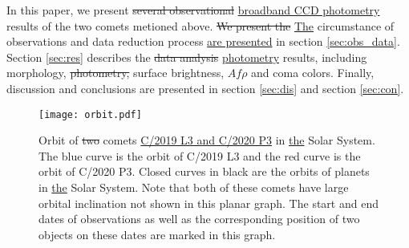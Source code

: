 In this paper, we present \st{several observational} \ul{broadband CCD photometry} results of the two comets metioned above. \st{We present the} \ul{The} circumstance of observations and data reduction process \ul{are presented} in section \ref{sec:obs_data}. Section \ref{sec:res} describes the \st{data analysis} \ul{photometry} results, including morphology, \st{photometry,} surface brightness, $Af\rho$ and coma colors. Finally, discussion and conclusions are presented in section \ref{sec:dis} and section \ref {sec:con}. 

\begin{figure}
    \centering
    \texttt{[image: orbit.pdf]}
    \caption{Orbit of \st{two} comets \ul{C/2019 L3 and C/2020 P3} in \ul{the} Solar System. The blue curve is the orbit of C/2019 L3 and the red curve is the orbit of C/2020 P3. Closed curves in black are the orbits of planets in \ul{the} Solar System. Note that both of these comets have large orbital inclination not shown in this planar graph. The start and end dates of observations as well as the corresponding position of two objects on these dates are marked in this graph. }
    \label{fig:orbit}
\end{figure}

